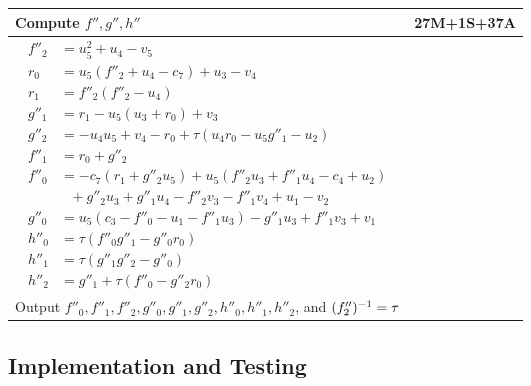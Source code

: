 \pagebreak
\begin{tabularx}{\linewidth}{|Xr|}
  \hline
    Compute $f'', g'', h''$ & 27M+1S+37A \\
  \hline
  {\begin{align*}
    f''_2 &= u_5^2 + u_4 - v_5 \\
    r_0   &= u_5(f''_2 + u_4 - c_7) + u_3 - v_4 \\
    r_1   &= f''_2(f''_2 - u_4) \\
    g''_1 &= r_1 - u_5(u_3 + r_0) + v_3 \\
    g''_2 &= -u_4u_5 + v_4 - r_0 + \tau(u_4r_0 - u_5g''_1 - u_2) \\
    f''_1 &= r_0 + g''_2 \\
    f''_0 &= -c_7(r_1 + g''_2u_5) + u_5(f''_2u_3 + f''_1u_4 - c_4 + u_2) \\
          &~~~ + g''_2u_3 + g''_1u_4 - f''_2v_3 - f''_1v_4 + u_1 - v_2 \\
    g''_0 &= u_5(c_3 - f''_0 - u_1 - f''_1u_3) - g''_1u_3 + f''_1v_3 + v_1 \\
    h''_0 &= \tau(f''_0g''_1 - g''_0r_0) \\
    h''_1 &= \tau(g''_1g''_2 - g''_0) \\
    h''_2 &= g''_1 + \tau(f''_0 - g''_2r_0)
  \end{align*}} & \\
  \hline
    Output $f''_0, f''_1, f''_2, g''_0, g''_1, g''_2, h''_0, h''_1, h''_2$, and $(f''_2)^{-1} = \tau$ & \\
  \hline
\end{tabularx}

\setlength{\abovedisplayskip}{\tempabovedisplayskip}
\setlength{\belowdisplayskip}{\tempbelowdisplayskip}




\subsection{Implementation and Testing}

